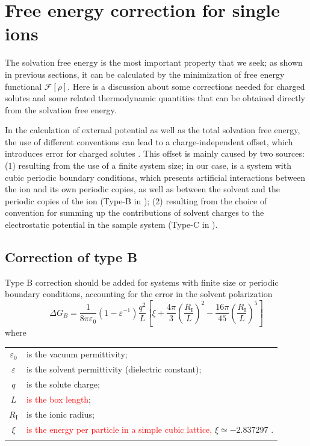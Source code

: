 
\chapter{Free energy correction for single ions\label{chpt:thermodynamic-quantities}}

The solvation free energy is the most important property that we seek;
as shown in previous sections, it can be calculated by the minimization
of free energy functional $\mathcal{F}[\rho]$. Here is a discussion
about some corrections needed for charged solutes and some related
thermodynamic quantities that can be obtained directly from the solvation
free energy.

In the calculation of external potential as well as the total solvation
free energy, the use of different conventions can lead to a charge-independent
offset, which introduces error for charged solutes \citep{Kastenholz_2006_I,Kastenholz_2006_II,Hunenberger_book}.
This offset is mainly caused by two sources: (1) resulting from the
use of a finite system size; in our case, is a system with cubic periodic
boundary conditions, which presents artificial interactions between
the ion and its own periodic copies, as well as between the solvent
and the periodic copies of the ion (Type-B in \citep{Kastenholz_2006_II});
(2) resulting from the choice of convention for summing up the contributions
of solvent charges to the electrostatic potential in the sample system
(Type-C in \citep{Kastenholz_2006_II}).

\section{Correction of type B}

Type B correction should be added for systems with finite size or
periodic boundary conditions, accounting for the error in the solvent
polarization 
\begin{equation}
\Delta G_{B}=\frac{1}{8\pi\varepsilon_{0}}\left(1-\varepsilon^{-1}\right)\frac{q^{2}}{L}\left[\xi+\frac{4\pi}{3}\left(\frac{R_{\mathrm{I}}}{L}\right)^{2}-\frac{16\pi}{45}\left(\frac{R_{\mathrm{I}}}{L}\right)^{5}\right]\label{eq:corr-B}
\end{equation}
where

\begin{tabular}{cl}
 $\varepsilon_{0}$ & is the vacuum permittivity;\tabularnewline
$\varepsilon$ & is the solvent permittivity (dielectric constant);\tabularnewline
$q$ & is the solute charge;\tabularnewline
$L$ & \textcolor{red}{is the box length};\tabularnewline
$R_{\mathrm{I}}$ & is the ionic radius;\tabularnewline
$\xi$ & \textcolor{red}{is the energy per particle in a simple cubic lattice,}
$\xi\simeq-2.837297$ \citep{nijboer}.\tabularnewline
 & \tabularnewline
\end{tabular} 

